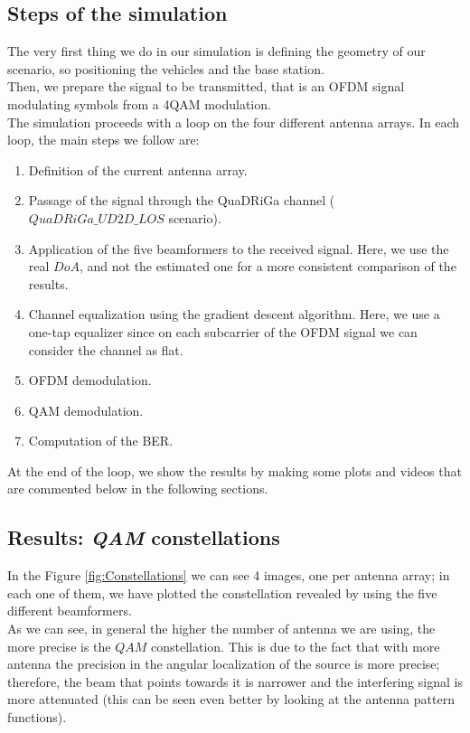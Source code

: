 \subsection{Steps of the simulation}

The very first thing we do in our simulation is defining the geometry of our scenario, so positioning the vehicles and the base station.\\
Then, we prepare the signal to be transmitted, that is an OFDM signal modulating symbols from a 4\-QAM modulation.\\
The simulation proceeds with a loop on the four different antenna arrays. In each loop, the main steps we follow are:

\begin{enumerate}
    \item Definition of the current antenna array.
    \item Passage of the signal through the QuaDRiGa channel ($QuaDRiGa\_UD2D\_LOS$ scenario).
    \item Application of the five beamformers to the received signal. Here, we use the real $DoA$, and not the estimated one
            for a more consistent comparison of the results.
    \item Channel equalization using the gradient descent algorithm. Here, we use a one-tap equalizer since on each subcarrier 
            of the OFDM signal we can consider the channel as flat.
    \item OFDM demodulation.
    \item QAM demodulation.
    \item Computation of the BER.
\end{enumerate}

At the end of the loop, we show the results by making some plots and videos that are commented below in the following sections.

\subsection{Results: \textit{QAM} constellations}

In the Figure \ref{fig:Constellations} we can see 4 images, one per antenna array; in each one of them, we have
plotted the constellation revealed by using the five different beamformers. \\ 
As we can see, in general the higher the number of antenna we are using, the more precise is the $QAM$ constellation. This
is due to the fact that with more antenna the precision in the angular localization of the source is more precise; therefore, 
the beam that points towards it is narrower and the interfering signal is more attenuated (this can be seen even better by
looking at the antenna pattern functions).

